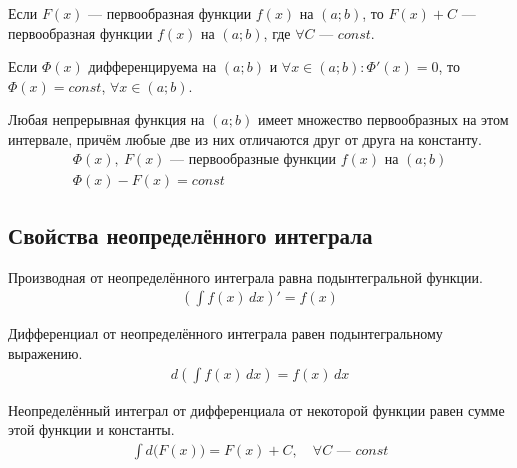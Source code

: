 \begin{property}
    Если $F(x)$ --- первообразная функции $f(x)$ на $(a;b)$, то $F(x) + C$ --- первообразная функции $f(x)$ на $(a;b)$, где $\forall C$ --- $const$.
\end{property}
\begin{property}
    \sloppy Если $\varPhi(x)$ дифференцируема на $(a;b)$ и $\forall x \in (a;b)\colon \varPhi'(x) = 0$, то $\varPhi (x) = const$, ${\forall x \in (a;b)}$.
\end{property}
\begin{property}
    Любая непрерывная функция на $(a;b)$ имеет множество первообразных на этом интервале, причём любые две из них отличаются друг от друга на константу.
    \begin{gather*}
        \varPhi(x),\ F(x) \text{ --- первообразные функции } f(x) \text{ на } (a;b) \\
        \varPhi(x) - F(x) = const
    \end{gather*}
\end{property}

\subsection*{Свойства неопределённого интеграла}
\setcounter{property}{0}

\begin{property}
    Производная от неопределённого интеграла равна подынтегральной функции.
    \begin{gather*}
        \boxed{\left(\int{f(x)\, dx}\right)' = f(x)}
    \end{gather*}
\end{property}

\begin{property}
    Дифференциал от неопределённого интеграла равен подынтегральному выражению.
    \begin{gather*}
        \boxed{d\left(\int f(x)\, dx\right) =  f(x)\, dx}
    \end{gather*}
\end{property}

\begin{property}
    Неопределённый интеграл от дифференциала от некоторой функции равен сумме этой функции и константы.
    \begin{gather*}
        \boxed{\int d\big(F(x)\big) = F(x) + C},\quad \forall C \text{ --- } const
    \end{gather*}
\end{property}

